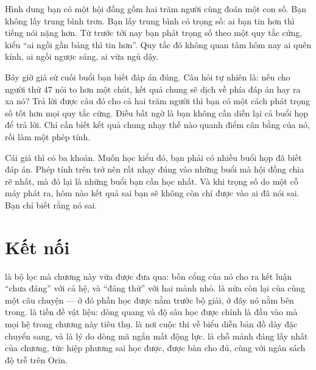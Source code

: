 \documentclass[../../deep_learning.tex]{subfiles}
\begin{document}
\begin{dongian}
Hình dung bạn có một hội đồng gồm hai trăm người cùng đoán một con số. Bạn không lấy trung bình trơn. Bạn lấy trung bình có trọng số: ai bạn tin hơn thì tiếng nói nặng hơn. Từ trước tới nay bạn phát trọng số theo một quy tắc cứng, kiểu ``ai ngồi gần bảng thì tin hơn''. Quy tắc đó không quan tâm hôm nay ai quên kính, ai ngồi ngược sáng, ai vừa ngủ dậy.

Bây giờ giả sử cuối buổi bạn biết đáp án đúng. Câu hỏi tự nhiên là: nếu cho người thứ 47 nói to hơn một chút, kết quả chung sẽ dịch về phía đáp án hay ra xa nó? Trả lời được câu đó cho cả hai trăm người thì bạn có một cách phát trọng số tốt hơn mọi quy tắc cứng. Điều bất ngờ là bạn không cần diễn lại cả buổi họp để trả lời. Chỉ cần biết kết quả chung nhạy thế nào quanh điểm cân bằng của nó, rồi làm một phép tính.

Cái giá thì có ba khoản. Muốn học kiểu đó, bạn phải có nhiều buổi họp đã biết đáp án. Phép tính trên trở nên rất nhạy đúng vào những buổi mà hội đồng chia rẽ nhất, mà đó lại là những buổi bạn cần học nhất. Và khi trọng số do một cỗ máy phát ra, hôm nào kết quả sai bạn sẽ không còn chỉ được vào ai đã nói sai. Bạn chỉ biết rằng nó sai.

\end{dongian}

\section{Kết nối}
 là bộ lọc mà chương này vừa được đưa qua: bốn cổng của nó cho ra kết luận ``chưa đáng'' với cả hệ, và ``đáng thử'' với hai mảnh nhỏ.  là nửa còn lại của cùng một câu chuyện --- ở đó phần học được nằm trước bộ giải, ở đây nó nằm bên trong.  là tiền đề vật liệu: dòng quang và độ sâu học được chính là đầu vào mà mọi hệ trong chương này tiêu thụ.  là nơi cuộc thi về biểu diễn bản đồ dày đặc chuyển sang, và là lý do dòng mã ngắn mất động lực.  là chỗ mảnh đáng lấy nhất của chương, tức hiệp phương sai học được, được bàn cho đủ, cùng với ngân sách độ trễ trên Orin.
\end{document}
